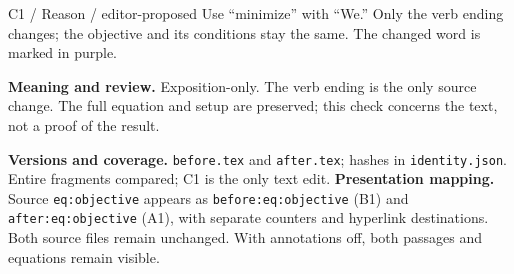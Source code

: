 \documentclass[11pt]{article}
\begin{document}
\ifrcannotations
\begin{rcContext}{C1 / Reason / editor-proposed}
Use ``minimize'' with ``We.'' Only the verb ending changes; the objective
and its conditions stay the same. The changed word is marked in purple.
\end{rcContext}
\fi
{\small\textbf{Meaning and review.} Exposition-only. The verb ending is the only source change. The full equation and setup
are preserved; this check concerns the text, not a proof of the result.}

{\footnotesize\color{rcMuted}\textbf{Versions and coverage.} \texttt{before.tex}
and \texttt{after.tex}; hashes in \texttt{identity.json}. Entire fragments
compared; C1 is the only text edit.
\textbf{Presentation mapping.} Source \texttt{eq:objective} appears as
\texttt{before:eq:objective} (B1) and \texttt{after:eq:objective} (A1), with
separate counters and hyperlink destinations. Both source files remain
unchanged. With annotations off, both passages and equations remain visible.}
\end{document}
